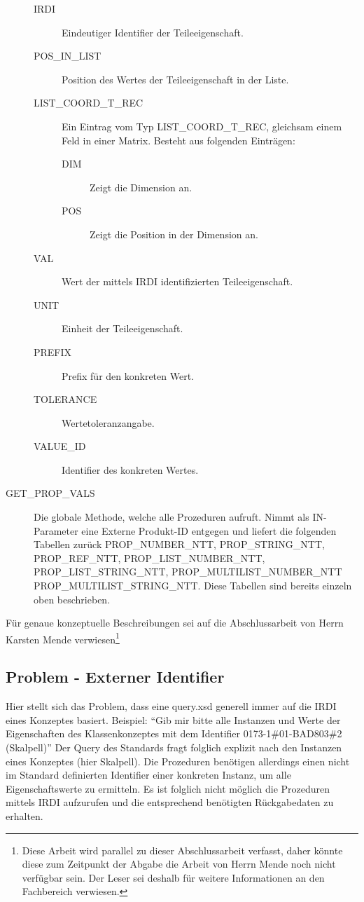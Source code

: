 \begin{description}
  \begin{description}
  \item[IRDI] Eindeutiger Identifier der Teileeigenschaft.
  \item[POS\_IN\_LIST] Position des Wertes der Teileeigenschaft in der Liste.
  \item[LIST\_COORD\_T\_REC] Ein Eintrag vom Typ LIST\_COORD\_T\_REC, gleichsam einem Feld in einer Matrix. Besteht aus folgenden Einträgen:
    \begin{description}	
    \item[DIM] Zeigt die Dimension an.
    \item[POS] Zeigt die Position in der Dimension an. 
    \end{description}
  \item[VAL] Wert der mittels IRDI identifizierten Teileeigenschaft.
  \item[UNIT] Einheit der Teileeigenschaft.
  \item[PREFIX] Prefix für den konkreten Wert.
  \item[TOLERANCE] Wertetoleranzangabe.
  \item[VALUE\_ID] Identifier des konkreten Wertes.
  \end{description}
\item[GET\_PROP\_VALS] Die globale Methode, welche alle Prozeduren aufruft. Nimmt als IN-Parameter eine Externe Produkt-ID entgegen und liefert die folgenden Tabellen zurück PROP\_NUMBER\_NTT,  PROP\_STRING\_NTT,  PROP\_REF\_NTT,  
PROP\_LIST\_NUMBER\_NTT, PROP\_LIST\_STRING\_NTT, PROP\_MULTILIST\_NUMBER\_NTT
PROP\_MULTILIST\_STRING\_NTT.
Diese Tabellen sind bereits einzeln oben beschrieben. 
\end{description}

Für genaue konzeptuelle Beschreibungen sei auf die Abschlussarbeit von Herrn Karsten Mende verwiesen\footnote{Diese Arbeit wird parallel zu dieser Abschlussarbeit verfasst, daher könnte diese zum Zeitpunkt der Abgabe die Arbeit von Herrn Mende noch nicht verfügbar sein. Der Leser sei deshalb für weitere Informationen an den Fachbereich verwiesen.}

\subsection{Problem - Externer Identifier}

Hier stellt sich das Problem, dass eine query.xsd generell immer auf die \gls{IRDI} eines Konzeptes basiert. 
Beispiel: \enquote{Gib mir bitte alle Instanzen und Werte der Eigenschaften des Klassenkonzeptes mit dem Identifier 0173-1\#01-BAD803\#2 (Skalpell)}
Der Query des Standards fragt folglich explizit nach den Instanzen eines Konzeptes (hier Skalpell). Die Prozeduren benötigen allerdings einen nicht im Standard definierten Identifier einer konkreten Instanz, um alle Eigenschaftswerte zu ermitteln. Es ist folglich nicht möglich die Prozeduren mittels \gls{IRDI} aufzurufen und die entsprechend benötigten Rückgabedaten zu erhalten. 

